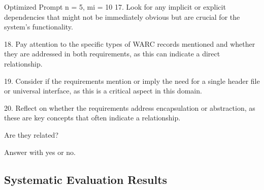 \begin{prompt}{Optimized Prompt n = 5, mi = 10}
17. Look for any implicit or explicit dependencies that might not be immediately obvious but are crucial for the system's functionality.

18. Pay attention to the specific types of WARC records mentioned and whether they are addressed in both requirements, as this can indicate a direct relationship.

19. Consider if the requirements mention or imply the need for a single header file or universal interface, as this is a critical aspect in this domain.

20. Reflect on whether the requirements address encapsulation or abstraction, as these are key concepts that often indicate a relationship.

Are they related?

Answer with \textquotesingle{}yes\textquotesingle{} or \textquotesingle{}no\textquotesingle{}.
\end{prompt}
\subsection{Systematic Evaluation Results}

\begin{landscape}
\begin{table}
    \centering
    \renewcommand{\arraystretch}{1}
    
    \renewcommand{\arraystretch}{1}
    \caption{Naive prompt optimization approach considering previous misclassified \TLs}
    \label{tab:placeholder}
\end{table}
\end{landscape}


